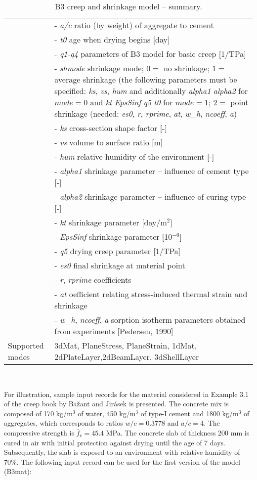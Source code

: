 \documentclass[a4paper]{article}
\newcommand{\param}[1]{{\it #1}}
\newenvironment{mmt}{\begin{tabular}{|l|p{9cm}|}}{\end{tabular}\\}
\newenvironment{mmt}{\begin{tabular}{|l|l|}}{\end{tabular}\\}
\begin{document}
\begin{table}[!htb]
\begin{mmt}
&- \param{a/c} ratio (by weight) of aggregate to cement \\
&- \param{t0} age when drying begins [day]\\
&- \param{q1-q4} parameters of B3 model for basic creep [1/TPa]\\
%
&- \param{shmode} shrinkage mode;
$0=$ no shrinkage;
$1=$ average shrinkage (the following parameters must be specified:
\param{ks}, \param{vs}, \param{hum} and additionally  \param{alpha1} \param{alpha2} for $mode = 0$
and \param{kt} \param{EpsSinf} \param{q5} \param{t0} for $mode = 1$;  
$2=$ point shrinkage (needed: \param{es0}, \param{r}, \param{rprime},
\param{at}, \param{w\_h}, \param{ncoeff}, \param{a})\\
%
&- \param{ks} cross-section shape factor [-]\\
&- \param{vs} volume to surface ratio [m]\\
&- \param{hum} relative humidity of the environment [-]\\
&- \param{alpha1} shrinkage parameter -- influence of cement type [-]\\
&- \param{alpha2} shrinkage parameter -- influence of curing type [-]\\
&- \param{kt} shrinkage parameter [day/m$^2$]\\
&- \param{EpsSinf} shrinkage parameter [10$^{-6}$]\\
&- \param{q5} drying creep parameter [1/TPa]\\
%
&- \param{es0} final shrinkage at material point\\
&- \param{r}, \param{rprime} coefficients\\
&- \param{at} oefficient relating stress-induced thermal strain and shrinkage\\
&- \param{w\_h}, \param{ncoeff}, \param{a} sorption isotherm parameters obtained from experiments [Pedersen, 1990] \\
%
Supported modes& 3dMat, PlaneStress, PlaneStrain, 1dMat,
2dPlateLayer,2dBeamLayer, 3dShellLayer\\
\hline
\end{mmt}
\caption{B3 creep and shrinkage model -- summary.}
\label{b3_table}
\end{table}

For illustration, sample input records for the material considered in Example 3.1 of the creep
book by Ba\v{z}ant and Jir\'{a}sek is presented. The concrete mix is composed
of 170 kg/m$^3$ of water, 450 kg/m$^3$ of type-I cement and 1800 kg/m$^3$ of aggregates,
which corresponds to ratios $w/c=0.3778$ and $a/c=4$. The compressive strength 
is $\bar{f}_c=45.4$ MPa. The concrete slab of thickness 200 mm is cured in air
with initial protection against drying until the age of 7 days.
Subsequently, the slab is exposed to an environment with
relative humidity of 70\%. The following input record can be used for the first
version of the model (B3mat):
\end{document}
